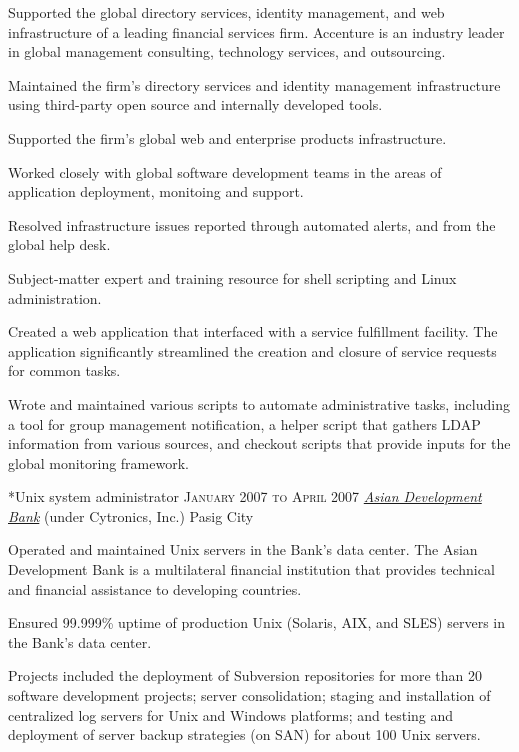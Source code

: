 \documentclass[10pt, a4paper, final]{article}
\begin{document}
\begin{section}
\begin{subsection}
    Supported the global directory services, identity management, and web infrastructure of a leading financial services firm. Accenture is an industry leader in global management consulting, technology services, and outsourcing.
    \vspace{1em}
    \begin{compactitem}
      \item Maintained the firm's directory services and identity management infrastructure using third-party open source and internally developed tools.
      \item Supported the firm's global web and enterprise products infrastructure.
      \item Worked closely with global software development teams in the areas of application deployment, monitoing and support.
      \item Resolved infrastructure issues reported through automated alerts, and from the global help desk.
      \item Subject-matter expert and training resource for shell scripting and Linux administration.
      \item Created a web application that interfaced with a service fulfillment facility. The application significantly streamlined the creation and closure of service requests for common tasks.
      \item Wrote and maintained various scripts to automate administrative tasks, including a tool for group management notification, a helper script that gathers LDAP information from various sources, and checkout scripts that provide inputs for the global monitoring framework.
      
    \end{compactitem}
  \end{subsection}
  \vspace{2.5em}

  \begin{subsection}*{Unix system administrator \hfill\textsc{January 2007 to April 2007}}
    \href{http://www.adb.org}{\textit{Asian Development Bank}} (under Cytronics, Inc.) \hfill Pasig City
    \vspace{1em}

    Operated and maintained Unix servers in the Bank's data center. The Asian Development Bank is a multilateral financial institution that provides technical and financial assistance to developing countries.
    \vspace{1em}
    \begin{compactitem}
      \item Ensured 99.999\% uptime of production Unix (Solaris, AIX, and SLES) servers in the Bank's data center.
      \item Projects included the deployment of Subversion repositories for more than 20 software development projects; server consolidation; staging and installation of centralized log servers for Unix and Windows platforms; and testing and deployment of server backup strategies (on SAN) for about 100 Unix servers.
      

\end{compactitem}
\end{subsection}
\end{section}
\end{document}
